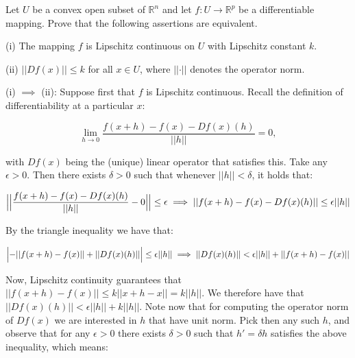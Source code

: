 \begin{exercise}{24}
    Let $U$ be a convex open subset of $\mathbb{R}^n$ and let $f: U \rightarrow \mathbb{R}^p$ be a differentiable mapping.
    Prove that the following assertions are equivalent.

    (i) The mapping $f$ is Lipschitz continuous on $U$ with Lipschitz constant $k$.

    (ii) $\lvert \lvert D f(x) \rvert \rvert \leq k$ for all $x \in U$, where $\lvert \lvert \cdot \rvert \rvert$ denotes the operator norm.
\end{exercise}

\begin{solution}
    
    (i) $\implies$ (ii): Suppose first that $f$ is Lipschitz continuous.
    Recall the definition of differentiability at a particular $x$:

    $$\lim_{h \rightarrow 0} \frac{f(x + h) - f(x) - D f(x)(h)}{\lvert \lvert h \rvert \rvert} = 0,$$

    with $Df(x)$ being the (unique) linear operator that satisfies this.
    Take any $\epsilon > 0$.
    Then there exists $\delta > 0$ such that whenever $\lvert \lvert h \rvert \rvert < \delta$, it holds that:

    $$\Bigl\lvert \Bigl\lvert \frac{f(x + h) - f(x) - Df(x)(h)}{\lvert \lvert h \rvert \rvert} - 0 \Bigr \rvert \Bigr \rvert \leq \epsilon \implies \lvert \lvert f(x + h) - f(x) - Df(x)(h) \rvert \rvert \leq \epsilon \lvert \lvert h \rvert \rvert$$

    By the triangle inequality we have that:

    $$\Bigl \lvert - \lvert \lvert f(x+h) - f(x) \rvert \rvert + \lvert \lvert Df(x)(h) \rvert \rvert \Bigr \rvert \leq \epsilon \lvert \lvert h \rvert \rvert \implies \lvert \lvert Df(x)(h) \rvert \rvert < \epsilon \lvert \lvert h \rvert \rvert + \lvert \lvert f(x+h) - f(x) \rvert \rvert$$

    Now, Lipschitz continuity guarantees that $\lvert \lvert f(x+h) - f(x) \rvert \rvert \leq k \lvert \lvert x + h - x \rvert \rvert = k \lvert \lvert h \rvert \rvert$.
    We therefore have that $\lvert \lvert Df(x)(h) \rvert \rvert < \epsilon \lvert \lvert h \rvert \rvert + k \lvert \lvert h \rvert \rvert$.
    Note now that for computing the operator norm of $Df(x)$ we are interested in $h$ that have unit norm.
    Pick then any such $h$, and observe that for any $\epsilon > 0$ there exists $\delta > 0$ such that $h' = \delta h$ satisfies the above inequality, which means:


\end{solution}
